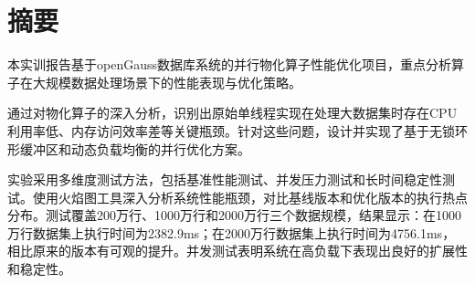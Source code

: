 \chapter{摘\texorpdfstring{\quad}{}要}
本实训报告基于openGauss数据库系统的并行物化算子性能优化项目，重点分析算子在大规模数据处理场景下的性能表现与优化策略。

通过对物化算子的深入分析，识别出原始单线程实现在处理大数据集时存在CPU利用率低、内存访问效率差等关键瓶颈。针对这些问题，设计并实现了基于无锁环形缓冲区和动态负载均衡的并行优化方案。

实验采用多维度测试方法，包括基准性能测试、并发压力测试和长时间稳定性测试。使用火焰图工具深入分析系统性能瓶颈，对比基线版本和优化版本的执行热点分布。测试覆盖200万行、1000万行和2000万行三个数据规模，结果显示：在1000万行数据集上执行时间为2382.9ms；在2000万行数据集上执行时间为4756.1ms，相比原来的版本有可观的提升。并发测试表明系统在高负载下表现出良好的扩展性和稳定性。


